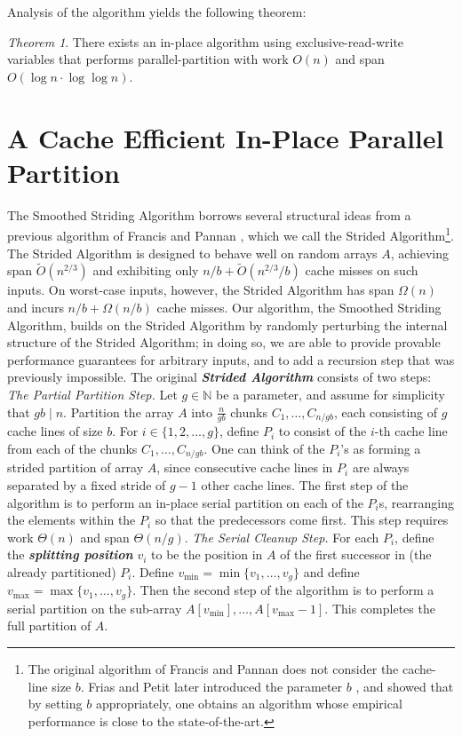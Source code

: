 \documentclass[sigconf, 10pt, nonacm]{acmart}
\newcommand{\defn}[1]{{\textit{\textbf{\boldmath #1}}}}
\renewcommand{\paragraph}[1]{\vspace{0.09in}\noindent{\bf \boldmath #1.}}
\theoremstyle{remark}
\newtheorem{theorem}{Theorem}[section]
\theoremstyle{remark}
\begin{document}
Analysis of the algorithm yields the following theorem:
\begin{theorem}
  \label{thminplace}
  There exists an in-place algorithm using exclusive-read-write
  variables that performs parallel-partition with work $O(n)$ and span
  $O(\log n \cdot \log \log n)$.
\end{theorem}

\section{A Cache Efficient In-Place Parallel Partition}\label{sec:smoothing}

\paragraph{The Strided Algorithm \cite{FrancisPa92}}
The Smoothed Striding Algorithm borrows several structural ideas from a
previous algorithm of Francis and Pannan \cite{FrancisPa92}, which we call the
Strided Algorithm\footnote{The original algorithm of Francis and Pannan
  \cite{FrancisPa92} does not consider the cache-line size $b$. Frias and Petit
later introduced the parameter $b$ \cite{Frias08}, and showed that by setting
$b$ appropriately, one obtains an algorithm whose empirical performance is
close to the state-of-the-art.}. The Strided Algorithm is designed to behave
well on random arrays $A$, achieving span $\tilde{O}(n^{2/3})$ and exhibiting
only $n/b + \tilde{O}(n^{2/3} / b)$  cache misses on such inputs. On worst-case
inputs, however, the Strided Algorithm has span $\Omega(n)$ and incurs $n/b +
\Omega(n/b)$ cache misses. Our algorithm, the Smoothed Striding Algorithm,
builds on the Strided Algorithm by randomly perturbing the internal structure
of the Strided Algorithm; in doing so, we are able to provide provable
performance guarantees for arbitrary inputs, and to add a recursion step that
was previously impossible. The original \defn{Strided Algorithm} consists of two steps: \\
\emph{The Partial Partition Step.} 
Let $g \in \mathbb{N}$ be a
parameter, and assume for simplicity that $gb \mid n$. Partition the
array $A$ into $\frac{n}{gb}$ chunks $C_1, \ldots, C_{n / gb}$,
each consisting of $g$ cache lines of size $b$.
For $i \in \{1, 2, \ldots, g\}$, define 
$P_i$ to consist of the $i$-th cache line from each of the
chunks $C_1, \ldots, C_{n / gb}$. One can think of the $P_i$'s
as forming a strided partition of array $A$, since
consecutive cache lines in $P_i$ are always separated by a fixed
stride of $g - 1$ other cache lines.
The first step of the algorithm is to perform an in-place serial
partition on each of the $P_i$s, rearranging the elements within the
$P_i$ so that the predecessors come first. This step requires work
$\Theta(n)$ and span $\Theta(n/g)$.
\emph{The Serial Cleanup Step. }
For each $P_i$, define the \defn{splitting position} $v_i$ to be the position
in $A$ of the first successor in (the already partitioned) $P_i$. Define
$v_{\text{min}} = \min\{v_1, \ldots, v_{g}\}$ and define $v_{\text{max}} =
\max\{v_1, \ldots, v_{g}\}$. Then the second step of the algorithm is to
perform a serial partition on the sub-array $A[v_{\text{min}}],\ldots,
A[v_{\text{max}}-1]$. This completes the full partition of $A$.
\end{document}
